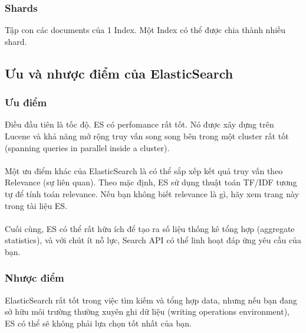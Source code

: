 \documentclass[a4paper,12pt]{report}
\begin{document}
\subsubsection*{Shards}
 Tập con các documents của 1 Index. Một Index có thể được chia thành nhiều shard.
\subsection*{Ưu và nhược điểm của ElasticSearch}
\subsubsection*{Ưu điểm}
Điều đầu tiên là tốc độ. ES có perfomance rất tốt. Nó được xây dựng trên Lucene và khả năng mở rộng truy vấn song song bên trong một cluster rất tốt (spanning queries in parallel inside a cluster). \\ \\
Một ưu điểm khác của ElasticSearch là có thể sắp xếp kết quả truy vấn theo Relevance (sự liên quan). Theo mặc định, ES sử dụng thuật toán TF/IDF tương tự để tính toán relevance. Nếu bạn không biết relevance là gì, hãy xem trang này trong tài liệu ES. \\ \\
Cuối cùng, ES có thể rất hữu ích để tạo ra số liệu thống kê tổng hợp (aggregate statistics), và với chút ít nỗ lực, Search API có thể linh hoạt đáp ứng yêu cầu của bạn. \\
\subsubsection{Nhược điểm}
ElasticSearch rất tốt trong việc tìm kiếm và tổng hợp data, nhưng nếu bạn đang sở hữu môi trường thường xuyên ghi dữ liệu (writing operations environment), ES có thể sẽ không phải lựa chọn tốt nhất của bạn. \\ \\
\end{document}
